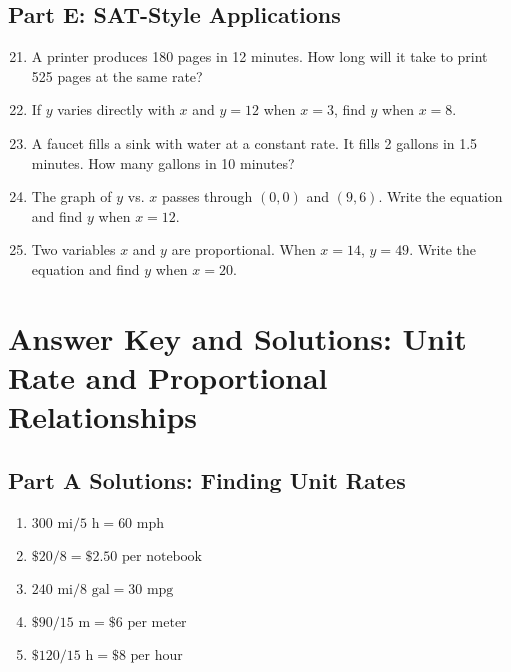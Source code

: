 \documentclass[12pt]{article}
\begin{document}
\subsection*{Part E: SAT-Style Applications}
\begin{enumerate}
  \setcounter{enumi}{20}
  \item A printer produces 180 pages in 12 minutes. How long will it take to print 525 pages at the same rate?
  \item If \(y\) varies directly with \(x\) and \(y=12\) when \(x=3\), find \(y\) when \(x=8\).
  \item A faucet fills a sink with water at a constant rate. It fills 2 gallons in 1.5 minutes. How many gallons in 10 minutes?
  \item The graph of \(y\) vs. \(x\) passes through \((0,0)\) and \((9,6)\). Write the equation and find \(y\) when \(x=12\).
  \item Two variables \(x\) and \(y\) are proportional. When \(x=14\), \(y=49\). Write the equation and find \(y\) when \(x=20\).
\end{enumerate}

\newpage


\section*{Answer Key and Solutions: Unit Rate and Proportional Relationships}

\subsection*{Part A Solutions: Finding Unit Rates}
\begin{enumerate}
  \item \(300\text{ mi}/5\text{ h} = \boxed{60\text{ mph}}\)
  \item \(\$20/8 = \boxed{\$2.50 \text{ per notebook}}\)
  \item \(240\text{ mi}/8\text{ gal} = \boxed{30\text{ mpg}}\)
  \item \(\$90/15\text{ m} = \boxed{\$6 \text{ per meter}}\)
  \item \(\$120/15\text{ h} = \boxed{\$8 \text{ per hour}}\)
\end{enumerate}
\end{document}
